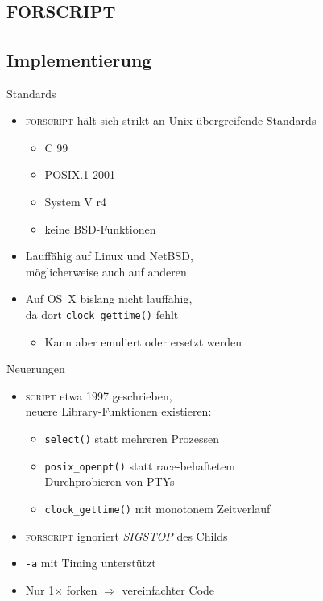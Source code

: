 \documentclass[ignorenonframetext,ucs]{beamer}
\def\cmd{\textsc}
\begin{document}
\section{\cmd{forscript}}

\subsection{Implementierung}

\begin{frame}{Standards}
\begin{itemize}
\item \cmd{forscript} hält sich strikt an Unix-übergreifende Standards\begin{itemize}
\item C 99
\item POSIX.1-2001
\item System V r4
\item keine BSD-Funktionen\end{itemize}
\item Lauffähig auf Linux und NetBSD, \\ möglicherweise auch auf anderen
\item Auf OS~X bislang nicht lauffähig, \\ da dort \texttt{clock\_gettime()} fehlt\begin{itemize}
\item Kann aber emuliert oder ersetzt werden\end{itemize}
\end{itemize}
\end{frame}

\begin{frame}{Neuerungen}
\begin{itemize}
\item \cmd{script} etwa 1997 geschrieben, \\ neuere Library-Funktionen existieren:\begin{itemize}
\item \texttt{select()} statt mehreren Prozessen
\item \texttt{posix\_openpt()} statt race-behaftetem \\ Durchprobieren von PTYs
\item \texttt{clock\_gettime()} mit monotonem Zeitverlauf\end{itemize}
\item \cmd{forscript} ignoriert \emph{SIGSTOP} des Childs
\item \texttt{-a} mit Timing unterstützt
\item Nur 1× forken $\Rightarrow$ vereinfachter Code
\end{itemize}
\end{frame}
\end{document}
